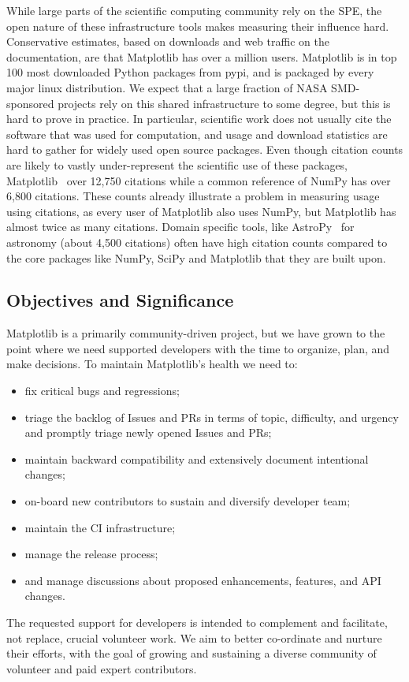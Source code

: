 \documentclass[12pt]{article}
\numberwithin{page}{section}
\begin{document}
While large parts of the scientific computing community rely on the
SPE, the open nature of these infrastructure tools makes measuring
their influence hard.  Conservative estimates, based on downloads and
web traffic on the documentation, are that Matplotlib has over a
million users.  Matplotlib is in top 100 most downloaded Python
packages from pypi, and is packaged by every major linux distribution.
We expect that a large fraction of NASA SMD-sponsored projects rely on
this shared infrastructure to some degree, but this is hard to prove
in practice.  In particular, scientific work does not usually cite the
software that was used for computation, and usage and download
statistics are hard to gather for widely used open source packages.
Even though citation counts are likely to vastly under-represent the
scientific use of these packages, Matplotlib~\cite{Hunter:2007} over
12,750 citations while a common reference of NumPy\cite{walt2011numpy}
has over 6,800 citations. These counts already illustrate a problem in
measuring usage using citations, as every user of Matplotlib also uses
NumPy, but Matplotlib has almost twice as many citations.  Domain
specific tools, like AstroPy~\cite{robitaille2013astropy} for
astronomy (about 4,500 citations) often have high citation counts
compared to the core packages like NumPy, SciPy and Matplotlib that
they are built upon.


\subsection{Objectives and Significance}


Matplotlib is a primarily community-driven project, but we have grown to the
point where we need supported developers with the time to organize, plan, and
make decisions.  To maintain Matplotlib's health we need to:
\begin{itemize}[noitemsep]
\item fix critical bugs and regressions;
\item triage the backlog of Issues and PRs in terms of topic,
  difficulty, and urgency and promptly triage newly opened Issues and
  PRs;
\item maintain backward compatibility and extensively document
  intentional changes;
\item on-board new contributors to sustain and diversify developer
  team;
\item maintain the CI infrastructure;
\item manage the release process;
\item and manage discussions about proposed enhancements, features,
  and API changes.
\end{itemize}
The requested support for developers is intended to complement and
facilitate, not replace, crucial volunteer work.  We aim to better
co-ordinate and nurture their efforts, with the goal of growing and
sustaining a diverse community of volunteer and paid expert
contributors.
\end{document}
